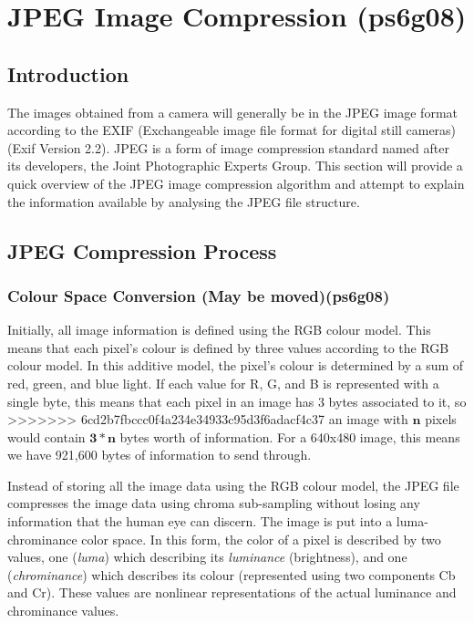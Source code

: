 
\section{JPEG Image Compression (ps6g08)}
\label{jpeg_image_compression}
\subsection{Introduction}
The images obtained from a camera will generally be in the JPEG image format
according to the 
EXIF (Exchangeable image file format for digital still cameras)
 (Exif Version 2.2).\cite{exif_std} 
JPEG is a form of image compression standard named after its developers, 
the Joint Photographic Experts Group. \cite{winzip_jpeg_compression}
This section will provide a quick overview of the JPEG image compression algorithm
and attempt to explain the information available by
analysing the JPEG file structure.

\subsection{JPEG Compression Process}

\subsubsection{Colour Space Conversion (May be moved)(ps6g08)}
\label{sec:colour_space_conversion}
Initially, all image information is defined using the RGB colour model.
This means that each pixel's colour is defined by three values according to the RGB colour model. 
In this additive model, the pixel's colour is determined by a sum of red, green, and blue light. 
If each value for R, G, and B is represented with a single byte, 
this means that each pixel in an image has 3 bytes associated to it, so 
>>>>>>> 6cd2b7fbccc0f4a234e34933c95d3f6adacf4c37
an image with $\mathbf{n}$ pixels would contain $\mathbf{3*n}$ bytes worth of information. 
For a 640x480 image, this means we have 921,600 bytes of information to send through.

Instead of storing all the image data using the RGB colour model, 
the JPEG file compresses the image data using chroma sub-sampling 
without losing any information that the human eye can discern. 
The image is put into  a luma-chrominance color space. In this form, the color of a pixel is described by two values, 
one (\emph{luma}) which describing its \emph{luminance} (brightness), and 
one (\emph{chrominance}) which describes its colour 
(represented using two components Cb and Cr).
These values are nonlinear representations
of the actual luminance and chrominance values.\cite{kerr_chroma_subsampling}


